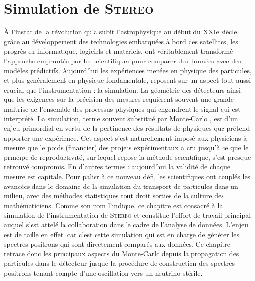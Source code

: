 

\chapter{Simulation de \textsc{Stereo}}
\label{chap:chapitre_3}


\minitoc

\newpage

\lettrine{À}{} l'instar de la révolution qu'a subit l'astrophysique au début du XXIe siècle grâce au développement des technologies embarquées à bord des satellites, les progrès en informatique, logiciels et matériels, ont véritablement transformé l'approche empruntée par les scientifiques pour comparer des données avec des modèles prédictifs. Aujourd'hui les expériences menées en physique des particules, et plus généralement en physique fondamentale, reposent sur un aspect tout aussi crucial que l'instrumentation : la simulation. La géométrie des détecteurs ainsi que les exigences sur la précision des mesures requièrent souvent une grande maitrise de l'ensemble des processus physiques qui engendrent le signal qui est interprété. La simulation, terme souvent substitué par \og Monte-Carlo \fg{}, est d'un enjeu primordial en vertu de la pertinence des résultats de physiques que prétend apporter une expérience. Cet aspect s'est naturellement imposé aux physiciens à mesure que le poids (financier) des projets expérimentaux a cru jusqu'à ce que le principe de reproductivité, sur lequel repose la méthode scientifique, s'est presque retrouvé compromis. En d'autres termes : aujourd'hui la validité de chaque mesure est capitale. Pour palier à ce nouveau défi, les scientifiques ont couplés les avancées dans le domaine de la simulation du transport de particules dans un milieu, avec des méthodes statistiques tout droit sorties de la culture des mathématiciens. Comme son nom l'indique, ce chapitre est consacré à la simulation de l'instrumentation de \textsc{Stereo} et constitue l'effort de travail principal auquel s'est attelé la collaboration dans le cadre de l'analyse de données. L'enjeu est de taille en effet, car c'est cette simulation qui est en charge de générer les spectres positrons qui sont directement comparés aux données. Ce chapitre retrace donc les principaux aspects du Monte-Carlo depuis la propagation des particules dans le détecteur jusque la procédure de construction des spectres positrons tenant compte d'une oscillation vers un neutrino stérile.\\

